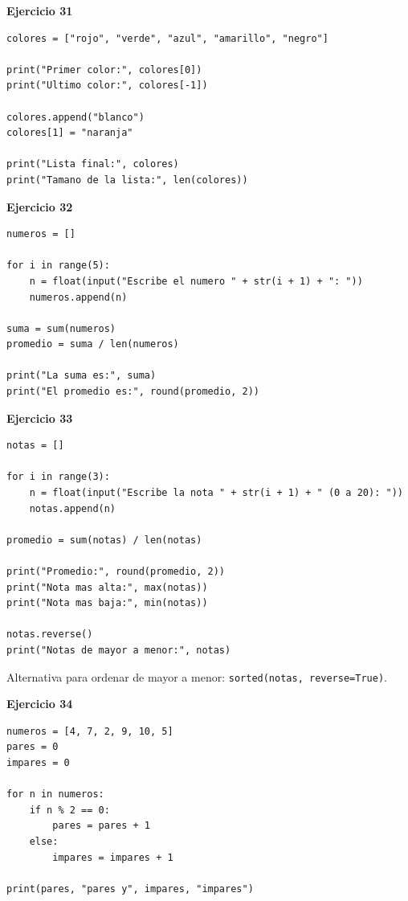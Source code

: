 \documentclass[12pt,a4paper]{article}
\begin{document}
\begin{cajaSolucion}
\textbf{Ejercicio 31}
\begin{lstlisting}[style=pythonStyle]
colores = ["rojo", "verde", "azul", "amarillo", "negro"]

print("Primer color:", colores[0])
print("Ultimo color:", colores[-1])

colores.append("blanco")
colores[1] = "naranja"

print("Lista final:", colores)
print("Tamano de la lista:", len(colores))
\end{lstlisting}
\end{cajaSolucion}

\begin{cajaSolucion}
\textbf{Ejercicio 32}
\begin{lstlisting}[style=pythonStyle]
numeros = []

for i in range(5):
    n = float(input("Escribe el numero " + str(i + 1) + ": "))
    numeros.append(n)

suma = sum(numeros)
promedio = suma / len(numeros)

print("La suma es:", suma)
print("El promedio es:", round(promedio, 2))
\end{lstlisting}
\end{cajaSolucion}

\begin{cajaSolucion}
\textbf{Ejercicio 33}
\begin{lstlisting}[style=pythonStyle]
notas = []

for i in range(3):
    n = float(input("Escribe la nota " + str(i + 1) + " (0 a 20): "))
    notas.append(n)

promedio = sum(notas) / len(notas)

print("Promedio:", round(promedio, 2))
print("Nota mas alta:", max(notas))
print("Nota mas baja:", min(notas))

notas.reverse()
print("Notas de mayor a menor:", notas)
\end{lstlisting}

\begin{cajaNota}
Alternativa para ordenar de mayor a menor: \texttt{sorted(notas, reverse=True)}.
\end{cajaNota}
\end{cajaSolucion}

\begin{cajaSolucion}
\textbf{Ejercicio 34}
\begin{lstlisting}[style=pythonStyle]
numeros = [4, 7, 2, 9, 10, 5]
pares = 0
impares = 0

for n in numeros:
    if n % 2 == 0:
        pares = pares + 1
    else:
        impares = impares + 1

print(pares, "pares y", impares, "impares")
\end{lstlisting}
\end{cajaSolucion}
\end{document}
